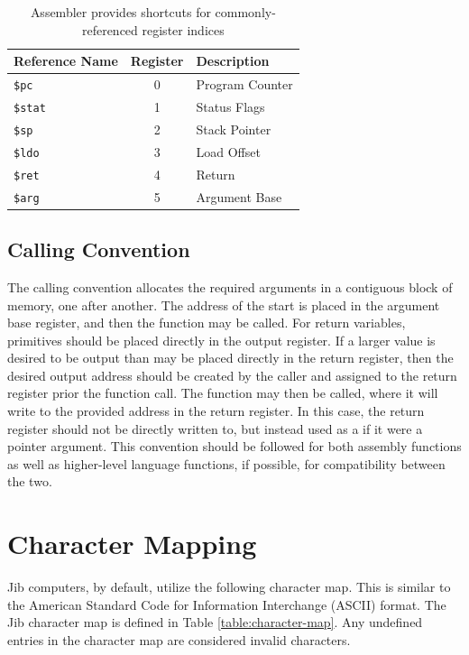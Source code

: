 \documentclass{article}
\begin{document}
\begin{table}[h!]
    \centering
    \begin{tabular}{l|cl}
        \hline
        Reference Name & Register & Description \\
        \hline
        \texttt{\$pc} & 0 & Program Counter \\
        \texttt{\$stat} & 1 & Status Flags \\
        \texttt{\$sp} & 2 & Stack Pointer \\
        \texttt{\$ldo} & 3 & Load Offset \\
        \texttt{\$ret} & 4 & Return \\
        \texttt{\$arg} & 5 & Argument Base \\
        \hline
    \end{tabular}
    \caption{Assembler provides shortcuts for commonly-referenced register indices}
    \label{table:assembler-register-references}
\end{table}

\subsection{Calling Convention}

The calling convention allocates the required arguments in a contiguous block of memory, one after another. The address of the start is placed in the argument base register, and then the function may be called. For return variables, primitives should be placed directly in the output register. If a larger value is desired to be output than may be placed directly in the return register, then the desired output address should be created by the caller and assigned to the return register prior the function call. The function may then be called, where it will write to the provided address in the return register. In this case, the return register should not be directly written to, but instead used as a if it were a pointer argument. This convention should be followed for both assembly functions as well as higher-level language functions, if possible, for compatibility between the two.

\section{Character Mapping}
\label{sec:character-map}

Jib computers, by default, utilize the following character map. This is similar to the American Standard Code for Information Interchange (ASCII) format. The Jib character map is defined in Table \ref{table:character-map}. Any undefined entries in the character map are considered invalid characters.
\end{document}

